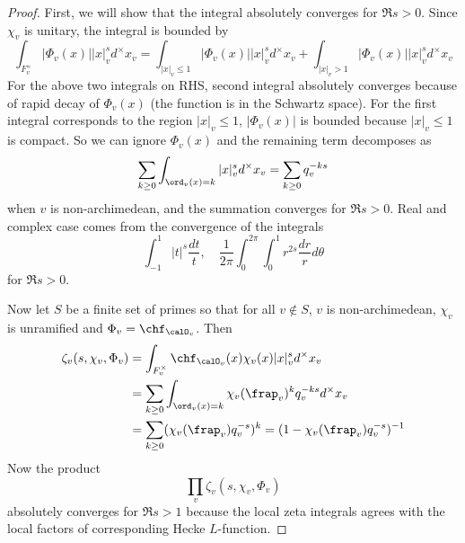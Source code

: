 \documentclass{article}
\begin{document}
\begin{proof}
First, we will show that the integral absolutely converges for $\Re s > 0$. 
Since $\chi_{v}$ is unitary, the integral is bounded by 
$$
\int_{F_{v}^{\times}} |\Phi_{v}(x)| |x|_{v}^{s} d^{\times}x_{v}  = \int_{|x|_{v} \leq 1}|\Phi_{v}(x)| |x|_{v}^{s} d^{\times}x_{v} + \int_{|x|_{v} > 1} |\Phi_{v}(x)| |x|_{v}^{s} d^{\times}x_{v}
$$
For the above two integrals on RHS, second integral absolutely converges because of rapid decay of $\Phi_{v}(x)$ (the function is in the Schwartz space). For the first integral corresponds to the region $|x|_{v} \leq 1$, $|\Phi_{v}(x)|$ is bounded because $|x|_{v} \leq 1$ is compact. So we can ignore $\Phi_{v}(x)$ and the remaining term decomposes as
$$
\sum_{k\geq 0} \int_{\ord_{v}(x) = k} |x|_{v}^{s} d^{\times}x_{v} = \sum_{k\geq 0} q_{v}^{-ks}
$$
when $v$ is non-archimedean, and the summation converges for $\Re s >0$. Real and complex case comes from the convergence of the integrals
$$
\int_{-1}^{1} |t|^{s} \frac{dt}{t}, \quad \frac{1}{2\pi} \int_{0}^{2\pi} \int_{0}^{1} r^{2s} \frac{dr}{r} d\theta
$$
for $\Re s >0$. 

Now let $S$ be a finite set of primes so that for all $v\not\in S$, $v$ is non-archimedean, $\chi_{v}$ is unramified and $\Phi_{v} = \chf_{\calO_{v}}$. Then 
\begin{align*}
\zeta_{v}(s, \chi_{v}, \Phi_{v}) &= \int_{F_{v}^{\times}} \chf_{\calO_{v}}(x) \chi_{v}(x) |x|_{v}^{s} d^{\times}x_{v} \\
&= \sum_{k\geq 0} \int_{\ord_{v}(x) = k} \chi_{v}(\frap_{v})^{k} q_{v}^{-ks} d^{\times}x_{v} \\
&= \sum_{k\geq 0} (\chi_{v}(\frap_{v})q_{v}^{-s})^{k} = (1-\chi_{v}(\frap_{v})q_{v}^{-s})^{-1}
\end{align*}
Now the product 
$$
\prod_{v} \zeta_{v}(s, \chi_{v}, \Phi_{v})
$$
absolutely converges for $\Re s > 1$ because the local zeta integrals agrees with the local factors of corresponding Hecke $L$-function. 
\end{proof}
\end{document}
